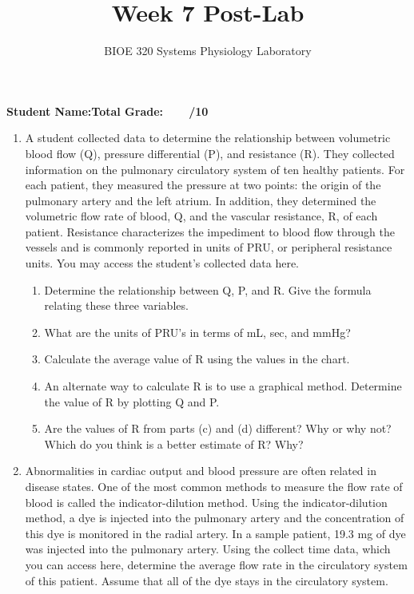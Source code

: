 \documentclass{article}
\title{Week 7 Post-Lab}
\author{BIOE 320 Systems Physiology Laboratory}
\date{}
\begin{document}
\maketitle
\large

\textbf{Student Name:}\hfill 	\textbf{Total Grade:\ \ \ \ /10}\vspace{0.5cm}

\begin{enumerate}
	\item A student collected data to determine the relationship between volumetric blood flow (Q), pressure differential (\textDelta P), and resistance (R). They collected information on the pulmonary circulatory system of ten healthy patients. For each patient, they measured the pressure at two points: the origin of the pulmonary artery and the left atrium. In addition, they determined the volumetric flow rate of blood, Q, and the vascular resistance, R, of each patient. Resistance characterizes the impediment to blood flow through the vessels and is commonly reported in units of PRU, or peripheral resistance units. You may access the student's collected data here.
		\begin{enumerate}
			\item Determine the relationship between Q, \textDelta P, and R. Give the formula relating these three variables.
			\item What are the units of PRU's in terms of mL, sec, and mmHg?
			\item Calculate the average value of R using the values in the chart.
			\item An alternate way to calculate R is to use a graphical method. Determine the value of R by plotting Q and \textDelta P.
			\item Are the values of R from parts (c) and (d) different? Why or why not? Which do you think is a better estimate of R? Why?
		\end{enumerate}
	\item Abnormalities in cardiac output and blood pressure are often related in disease states. One of the most common methods to measure the flow rate of blood is called the indicator-dilution method. Using the indicator-dilution method, a dye is injected into the pulmonary artery and the concentration of this dye is monitored in the radial artery. In a sample patient, 19.3 mg of dye was injected into the pulmonary artery. Using the collect time data, which you can access here, determine the average flow rate in the circulatory system of this patient. Assume that all of the dye stays in the circulatory system.
\end{enumerate}
\end{document}
